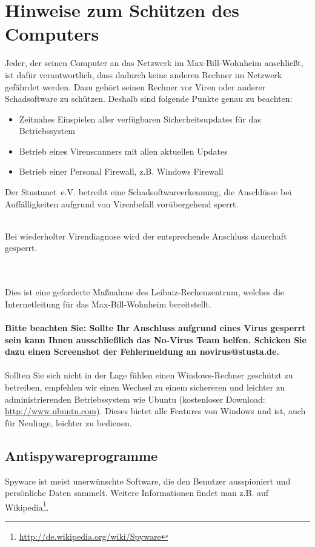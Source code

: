 \documentclass[a4paper,12pt]{scrartcl}
\begin{document}
\section*{Hinweise zum Schützen des Computers}
Jeder, der seinen Computer an das Netzwerk im Max-Bill-Wohnheim anschließt, ist dafür verantwortlich, dass dadurch keine anderen Rechner im Netzwerk gefährdet werden. Dazu gehört seinen Rechner vor Viren oder anderer Schadsoftware zu schützen. Deshalb sind folgende Punkte genau zu beachten:
\begin{itemize}
    \item Zeitnahes Einspielen aller verfügbaren Sicherheitsupdates für das Betriebssystem
    \item Betrieb eines Virenscanners mit allen aktuellen Updates
    \item Betrieb einer Personal Firewall, z.B. Windows Firewall
\end{itemize}
Der Stustanet~e.V. betreibt eine Schadsoftwareerkennung, die Anschlüsse bei Auffälligkeiten aufgrund von Virenbefall vorübergehend sperrt.
\\
 \begin{bfseries}
\\Bei wiederholter Virendiagnose wird der entsprechende Anschluss dauerhaft gesperrt.
\end{bfseries}
\\
\\Dies ist eine geforderte Maßnahme des Leibniz-Rechenzentrum, welches die Internetleitung für das Max-Bill-Wohnheim bereitstellt.
\\
\\ \textbf{Bitte beachten Sie: Sollte Ihr Anschluss aufgrund eines Virus gesperrt sein kann Ihnen ausschließlich das No-Virus Team helfen. Schicken Sie dazu einen Screenshot der Fehlermeldung an \glqq novirus@stusta.de\grqq .}
\\
\\Sollten Sie sich nicht in der Lage fühlen einen Windows-Rechner geschützt zu betreiben, empfehlen wir einen Wechsel zu einem sichereren und leichter zu administrierenden Betriebssystem wie Ubuntu (kostenloser Download: \url{http://www.ubuntu.com}). Dieses bietet alle Features von Windows und ist, auch für Neulinge, leichter zu bedienen.

\subsection*{Antispywareprogramme}

Spyware ist meist unerwünschte Software, die den Benutzer ausspioniert und persönliche Daten sammelt. Weitere Informationen findet man z.B. auf Wikipedia\footnote{\url{http://de.wikipedia.org/wiki/Spyware}}.
\end{document}
